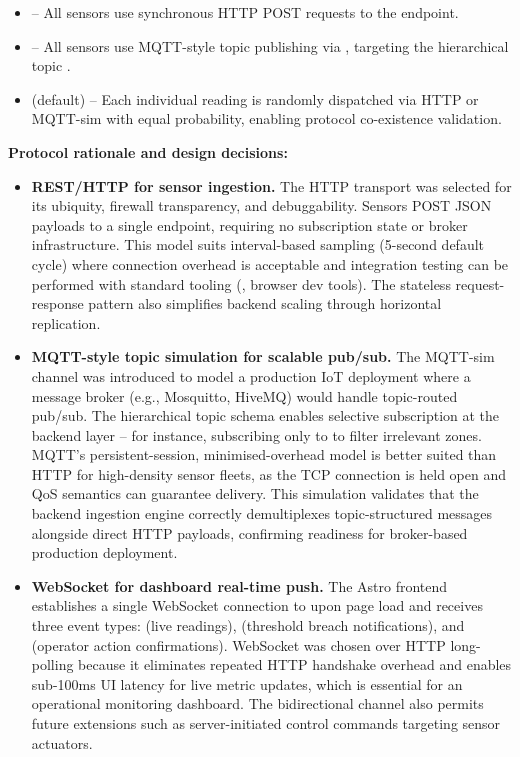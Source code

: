 \documentclass[12pt,a4paper]{article}
\begin{document}
\begin{itemize}[leftmargin=1.5em]
	\item {} -- All sensors use synchronous HTTP POST requests to the  endpoint.
	\item {} -- All sensors use MQTT-style topic publishing via , targeting the hierarchical topic .
	\item {} (default) -- Each individual reading is randomly dispatched via HTTP or MQTT-sim with equal probability, enabling protocol co-existence validation.
\end{itemize}

\textbf{Protocol rationale and design decisions:}

\begin{itemize}[leftmargin=1.5em]
	\item \textbf{REST/HTTP for sensor ingestion.} The HTTP transport was selected for its ubiquity, firewall transparency, and debuggability. Sensors POST JSON payloads to a single endpoint, requiring no subscription state or broker infrastructure. This model suits interval-based sampling (5-second default cycle) where connection overhead is acceptable and integration testing can be performed with standard tooling (, browser dev tools). The stateless request-response pattern also simplifies backend scaling through horizontal replication.

	\item \textbf{MQTT-style topic simulation for scalable pub/sub.} The MQTT-sim channel was introduced to model a production IoT deployment where a message broker (e.g., Mosquitto, HiveMQ) would handle topic-routed pub/sub. The hierarchical topic schema  enables selective subscription at the backend layer -- for instance, subscribing only to  to filter irrelevant zones. MQTT's persistent-session, minimised-overhead model is better suited than HTTP for high-density sensor fleets, as the TCP connection is held open and QoS semantics can guarantee delivery. This simulation validates that the backend ingestion engine correctly demultiplexes topic-structured messages alongside direct HTTP payloads, confirming readiness for broker-based production deployment.

	\item \textbf{WebSocket for dashboard real-time push.} The Astro frontend establishes a single WebSocket connection to  upon page load and receives three event types:  (live readings),  (threshold breach notifications), and  (operator action confirmations). WebSocket was chosen over HTTP long-polling because it eliminates repeated HTTP handshake overhead and enables sub-100ms UI latency for live metric updates, which is essential for an operational monitoring dashboard. The bidirectional channel also permits future extensions such as server-initiated control commands targeting sensor actuators.
\end{itemize}
\end{document}
